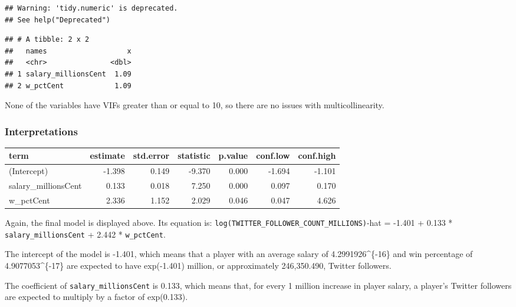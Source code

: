 \documentclass[]{article}
\newenvironment{Shaded}{\begin{snugshade}}{\end{snugshade}}
\newcommand{\DataTypeTok}[1]{\textcolor[rgb]{0.13,0.29,0.53}{#1}}
\newcommand{\DecValTok}[1]{\textcolor[rgb]{0.00,0.00,0.81}{#1}}
\newcommand{\KeywordTok}[1]{\textcolor[rgb]{0.13,0.29,0.53}{\textbf{#1}}}
\newcommand{\NormalTok}[1]{#1}
\newcommand{\OperatorTok}[1]{\textcolor[rgb]{0.81,0.36,0.00}{\textbf{#1}}}
\newcommand{\OtherTok}[1]{\textcolor[rgb]{0.56,0.35,0.01}{#1}}
\newcommand{\StringTok}[1]{\textcolor[rgb]{0.31,0.60,0.02}{#1}}
\begin{document}
\begin{verbatim}
## Warning: 'tidy.numeric' is deprecated.
## See help("Deprecated")
\end{verbatim}

\begin{verbatim}
## # A tibble: 2 x 2
##   names                   x
##   <chr>               <dbl>
## 1 salary_millionsCent  1.09
## 2 w_pctCent            1.09
\end{verbatim}

None of the variables have VIFs greater than or equal to 10, so there
are no issues with multicollinearity.

\hypertarget{interpretations}{%
\subsubsection{Interpretations}\label{interpretations}}

\begin{Shaded}
\end{Shaded}

\begin{longtable}[]{@{}lrrrrrr@{}}
\toprule
term & estimate & std.error & statistic & p.value & conf.low &
conf.high\tabularnewline
\midrule
\endhead
(Intercept) & -1.398 & 0.149 & -9.370 & 0.000 & -1.694 &
-1.101\tabularnewline
salary\_millionsCent & 0.133 & 0.018 & 7.250 & 0.000 & 0.097 &
0.170\tabularnewline
w\_pctCent & 2.336 & 1.152 & 2.029 & 0.046 & 0.047 &
4.626\tabularnewline
\bottomrule
\end{longtable}

Again, the final model is displayed above. Its equation is:
\texttt{log(TWITTER\_FOLLOWER\_COUNT\_MILLIONS)}-hat = -1.401 + 0.133 *
\texttt{salary\_millionsCent} + 2.442 * \texttt{w\_pctCent}.

The intercept of the model is -1.401, which means that a player with an
average salary of 4.2991926\^{}\{-16\} and win percentage of
4.9077053\^{}\{-17\} are expected to have exp(-1.401) million,
or approximately 246,350.490, Twitter followers.

The coefficient of \texttt{salary\_millionsCent} is 0.133, which means
that, for every 1 million increase in player salary, a player's Twitter
followers are expected to multiply by a factor of exp(0.133).
\end{document}
